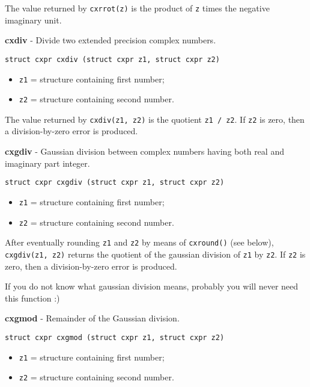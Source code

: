 \documentclass{article}
\begin{document}
The value returned by \texttt{cxrrot(z)} is the product of
\texttt{z} times the negative imaginary unit.


\hrulefill{}

\textbf{cxdiv} - Divide two extended precision complex numbers.

\begin{verbatim}
struct cxpr cxdiv (struct cxpr z1, struct cxpr z2)
\end{verbatim}

\begin{itemize}
\item \texttt{z1} = structure containing first number;
\item \texttt{z2} = structure containing second number.
\end{itemize}

The value returned by \texttt{cxdiv(z1, z2)} is
the quotient \texttt{z1 / z2}. If \texttt{z2} is zero, then a
division-by-zero error is produced.


\hrulefill{}

\textbf{cxgdiv} - Gaussian division between complex numbers having
both real and imaginary part integer.

\begin{verbatim}
struct cxpr cxgdiv (struct cxpr z1, struct cxpr z2)
\end{verbatim}

\begin{itemize}
\item \texttt{z1} = structure containing first number;
\item \texttt{z2} = structure containing second number.
\end{itemize}

After eventually rounding \texttt{z1} and \texttt{z2} by means of
\texttt{cxround()} (see below), \texttt{cxgdiv(z1, z2)} returns
the quotient of the gaussian division of \texttt{z1} by \texttt{z2}. 
If \texttt{z2} is zero, then a division-by-zero error is produced.

If you do not know what gaussian division means, probably
you will never need this function :)


\hrulefill{}

\textbf{cxgmod} - Remainder of the Gaussian division.

\begin{verbatim}
struct cxpr cxgmod (struct cxpr z1, struct cxpr z2)
\end{verbatim}

\begin{itemize}
\item \texttt{z1} = structure containing first number;
\item \texttt{z2} = structure containing second number.
\end{itemize}
\end{document}
